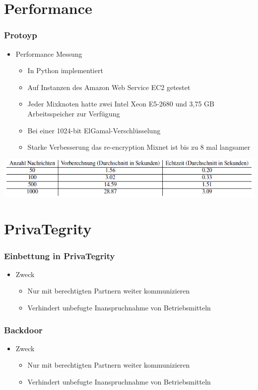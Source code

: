 \documentclass[t, xcolor=dvipsnames]{beamer}
\begin{document}
\section{Performance}
\begin{frame}
	\frametitle{Protoyp}
	\begin{itemize}
		\item Performance Messung
			\begin{itemize}
				\item In Python implementiert
				\item Auf Instanzen des Amazon Web Service EC2 getestet
				\item Jeder Mixknoten hatte zwei Intel Xeon E5-2680 und 3,75 GB Arbeitsspeicher zur Verfügung
				\item Bei einer 1024-bit ElGamal-Verschlüsselung
				\item Starke Verbesserung das re-encryption Mixnet ist bis zu 8 mal	langsamer
			\end{itemize}
			
	\end{itemize}
	\begin{center}
				\includegraphics [width=1\textwidth]{pic/PrototypMessung.png}
			\end{center}
	\vspace{\fill}
\end{frame}

\section{PrivaTegrity}

\begin{frame}
	\frametitle{Einbettung in PrivaTegrity}
	\begin{itemize}
		\item Zweck
			\begin{itemize}
				\item Nur mit \alert{berechtigten Partnern} weiter kommunizieren
				\item Verhindert unbefugte Inanspruchnahme von Betriebsmitteln
			\end{itemize}
	\end{itemize}
	\vspace{\fill}
\end{frame}


\begin{frame}
	\frametitle{Backdoor}
	\begin{itemize}
		\item Zweck
			\begin{itemize}
				\item Nur mit \alert{berechtigten Partnern} weiter kommunizieren
				\item Verhindert unbefugte Inanspruchnahme von Betriebsmitteln
			\end{itemize}
	\end{itemize}
	\vspace{\fill}
\end{frame}
\end{document}
